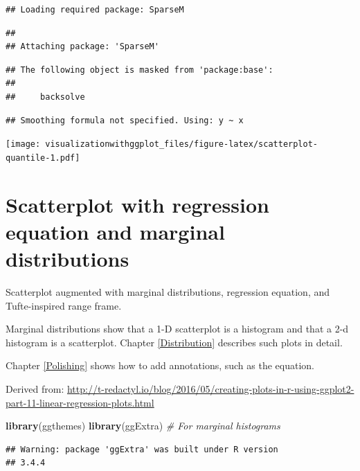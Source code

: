 \documentclass[]{krantz}
\makeatletter
\newenvironment{Shaded}{\begin{snugshade}}{\end{snugshade}}
\newcommand{\KeywordTok}[1]{\textcolor[rgb]{0.13,0.29,0.53}{\textbf{#1}}}
\newcommand{\CommentTok}[1]{\textcolor[rgb]{0.56,0.35,0.01}{\textit{#1}}}
\newcommand{\NormalTok}[1]{#1}
\newenvironment{kframe}{%
\medskip{}
\setlength{\fboxsep}{.8em}
 \def\at@end@of@kframe{}%
 \ifinner\ifhmode%
  \def\at@end@of@kframe{\end{minipage}}%
  \begin{minipage}{\columnwidth}%
 \fi\fi%
 \def\FrameCommand##1{\hskip\@totalleftmargin \hskip-\fboxsep
 \colorbox{shadecolor}{##1}\hskip-\fboxsep
     \hskip-\linewidth \hskip-\@totalleftmargin \hskip\columnwidth}%
 \MakeFramed {\advance\hsize-\width
   \@totalleftmargin\z@ \linewidth\hsize
   \@setminipage}}%
 {\par\unskip\endMakeFramed%
 \at@end@of@kframe}
\renewenvironment{Shaded}{\begin{kframe}}{\end{kframe}}
\theoremstyle{definition}
\theoremstyle{definition}
\theoremstyle{definition}
\theoremstyle{remark}
\makeatother
\begin{document}
\begin{verbatim}
## Loading required package: SparseM
\end{verbatim}

\begin{verbatim}
## 
## Attaching package: 'SparseM'
\end{verbatim}

\begin{verbatim}
## The following object is masked from 'package:base':
## 
##     backsolve
\end{verbatim}

\begin{verbatim}
## Smoothing formula not specified. Using: y ~ x
\end{verbatim}

\texttt{[image: visualizationwithggplot\_files/figure-latex/scatterplot-quantile-1.pdf]}

\section{Scatterplot with regression equation and marginal
distributions}\label{scatterplot-with-regression-equation-and-marginal-distributions}

Scatterplot augmented with marginal distributions, regression equation,
and Tufte-inspired range frame.

Marginal distributions show that a 1-D scatterplot is a histogram and
that a 2-d histogram is a scatterplot. Chapter \ref{Distribution}
describes such plots in detail.

Chapter \ref{Polishing} shows how to add annotations, such as the
equation.

Derived from:
\url{http://t-redactyl.io/blog/2016/05/creating-plots-in-r-using-ggplot2-part-11-linear-regression-plots.html}

\begin{Shaded}
\begin{Highlighting}[]
\KeywordTok{library}\NormalTok{(ggthemes)}
\KeywordTok{library}\NormalTok{(ggExtra) }\CommentTok{# For marginal histograms}
\end{Highlighting}
\end{Shaded}

\begin{verbatim}
## Warning: package 'ggExtra' was built under R version
## 3.4.4
\end{verbatim}
\end{document}

